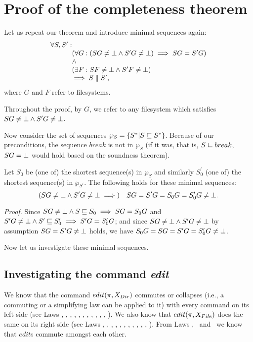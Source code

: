 \section{Proof of the completeness theorem}
\label{app:compl}

Let us repeat our theorem and introduce minimal sequences again:
\[\begin{array}{r@{}l}
\forall S,S':&\\
&(\forall G: (SG\ne\ud\wedge S'G\ne\ud)\implies SG=S'G)\\
&\wedge\\
&(\exists F: SF\ne\ud\wedge S'F\ne\ud)\\
&\implies S \eqifnbr S',
\end{array}\]
where \(G\) and \(F\) refer to filesystems.
\newcommand{\varsection}[1]{\subsection{#1}}%

Throughout the proof, 
by \(G\), we
refer to any filesystem which satisfies \(SG\ne\bot\wedge S'G\ne\bot\).

Now consider the set of sequences \(\wp_S = \{ S^* | S \sqsubseteq S^*\}\).
Because of our preconditions, the sequence \(break\) is not in
\(\wp_S\) (if it was, that is, \(S\sqsubseteq break\), \(SG=\bot\) would hold
based on the soundness theorem).

Let \(S_0\) be (one of) the shortest sequence(s) in \(\wp_S\) and
similarly
\(S^\prime_0\) (one of) the shortest sequence(s) in \(\wp_{S^\prime}\). 
%
The following holds for these minimal sequences:
\[(SG\ne\bot\wedge S'G\ne\bot\implies) \quad SG=S'G=S_0G=S'_0G\ne\bot.\]
\begin{notrsi}
\emph{Proof.} Since 
\(SG\ne\bot\wedge S\sqsubseteq S_0\implies SG=S_0G\) and
\(S'G\ne\bot\wedge S'\sqsubseteq S'_0\implies S'G=S'_0G\); and since
\(SG\ne\bot\wedge S'G\ne\bot\) by assumption \(SG=S'G\ne\bot\) holds,
we have \(S_0G=SG=S'G=S'_0G\ne\bot\).


\medskip
\end{notrsi}
Now let us investigate these minimal sequences. 

\varsection{Investigating the command \emph{edit}}

We know that the command \(edit(\pi,X_{Dir})\) commutes or collapses
(i.e., a commuting or a simplifying law can be applied to it) with
every command on its left side (see Laws \lawi, \lawip, \lawiv,
\lawvp, \lawvip,
\lawiiiap, \lawxiii, \lawxviii, \lawxix, \lawxxiv, \lawxxvi, \lawiib).
%
We also know that \(edit(\pi,X_{File})\) does the same on its right side
(see Laws \lawi, \lawip, \lawiv, \lawv, \lawvi, \lawiia, \lawiiib, \lawx,
\lawxi, \lawxii, \lawxxiv, \lawxxv).
%
From Laws \lawi, \lawip~and \lawxxiv~we know that \(edit\)s commute
amongst each other.

